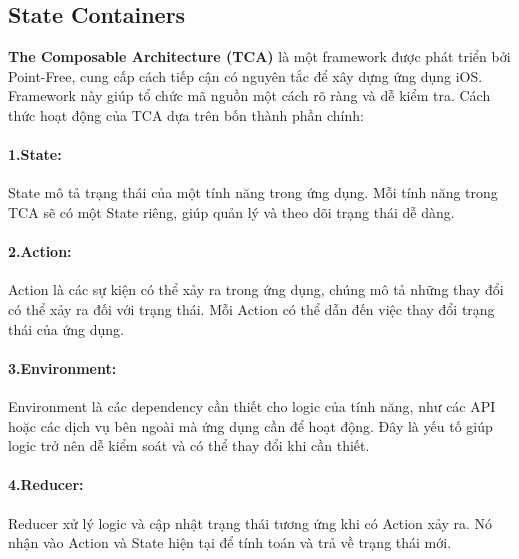 \subsection{State Containers}

\textbf{The Composable Architecture (TCA)} là một framework được phát triển bởi Point-Free, cung cấp cách tiếp cận có nguyên tắc để xây dựng ứng dụng iOS. Framework này giúp tổ chức mã nguồn một cách rõ ràng và dễ kiểm tra.
Cách thức hoạt động của TCA dựa trên bốn thành phần chính:
\paragraph*{1.State:}
State mô tả trạng thái của một tính năng trong ứng dụng. Mỗi tính năng trong TCA sẽ có một State riêng, giúp quản lý và theo dõi trạng thái dễ dàng.
\paragraph*{2.Action:}
Action là các sự kiện có thể xảy ra trong ứng dụng, chúng mô tả những thay đổi có thể xảy ra đối với trạng thái. Mỗi Action có thể dẫn đến việc thay đổi trạng thái của ứng dụng.
\paragraph*{3.Environment:}
Environment là các dependency cần thiết cho logic của tính năng, như các API hoặc các dịch vụ bên ngoài mà ứng dụng cần để hoạt động. Đây là yếu tố giúp logic trở nên dễ kiểm soát và có thể thay đổi khi cần thiết.
\paragraph*{4.Reducer:}
Reducer xử lý logic và cập nhật trạng thái tương ứng khi có Action xảy ra. Nó nhận vào Action và State hiện tại để tính toán và trả về trạng thái mới.

